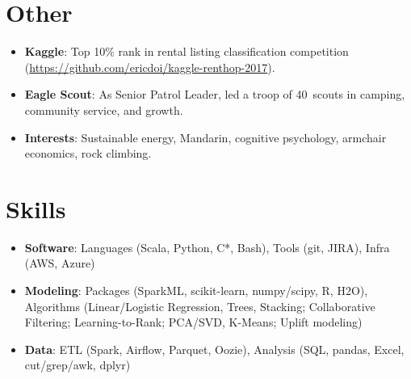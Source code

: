 \documentclass[letterpaper,11pt]{article}
\newcommand{\plus}{\raisebox{.4\height}{\scalebox{.6}{+}}}
\newcommand{\resumeItem}[2]{
  \item\small{
    \textbf{#1}{: #2 \vspace{-2pt}}
  }
}
\newcommand{\resumeSubItem}[2]{\resumeItem{#1}{#2}\vspace{-4pt}}
\newcommand{\resumeSubHeadingListStart}{\begin{itemize}[leftmargin=*]}
\newcommand{\resumeSubHeadingListEnd}{\end{itemize}}
\begin{document}
\section{Other}
  \resumeSubHeadingListStart
    \resumeSubItem{Kaggle}
      {Top 10\% rank in rental listing classification competition (\href{github.com/ericdoi/kaggle-renthop-2017}{https://github.com/ericdoi/kaggle-renthop-2017}).}
    \resumeSubItem{Eagle Scout}
      {As Senior Patrol Leader, led a troop of 40\plus~scouts in camping, community service, and growth.}
    \resumeSubItem{Interests}
      {Sustainable energy, Mandarin, cognitive psychology, armchair economics, rock climbing.}
  \resumeSubHeadingListEnd


\section{Skills}
  \resumeSubHeadingListStart
    \resumeItem{Software}{Languages (Scala, Python, C*, Bash), Tools (git, JIRA), Infra (AWS, Azure)}
    \resumeItem{Modeling}{Packages (SparkML, scikit-learn, numpy/scipy, R, H2O), Algorithms (Linear/Logistic Regression, Trees, Stacking; Collaborative Filtering; Learning-to-Rank; PCA/SVD, K-Means; Uplift modeling)}
    \resumeItem{Data}{ETL (Spark, Airflow, Parquet, Oozie), Analysis (SQL, pandas, Excel, cut/grep/awk, dplyr)}
  \resumeSubHeadingListEnd


\end{document}

